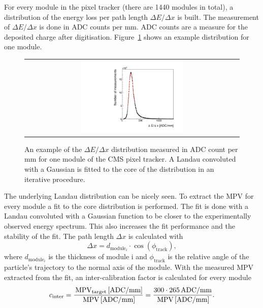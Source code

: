 For every module in the pixel tracker (there are 1440 modules in total), a distribution of the energy loss per path length $\Delta E/\Delta x$ is built.
The measurement of $\Delta E/\Delta x$ is done in ADC counts per mm.
ADC counts are a measure for the deposited charge after digitisation.
Figure~\ref{fig:dEdx_Module} shows an example distribution for one module.
\begin{figure}[!bt]
  \centering 
  \begin{tabular}{c}
  \includegraphics[width=0.49\textwidth]{figures/analysis/Landau_Module_352476680.pdf}
  \end{tabular}
  \caption{An example of the $\Delta E/\Delta x$ distribution measured in ADC count per mm for one module of the CMS pixel tracker. 
           A Landau convoluted with a Gaussian is fitted to the core of the distribution in an iterative procedure.} 
  \label{fig:dEdx_Module}
\end{figure}
The underlying Landau distribution can be nicely seen. 
To extract the MPV for every module a fit to the core distribution is performed.
The fit is done with a Landau convoluted with a Gaussian function to be closer to the experimentally observed energy spectrum.
This also increases the fit performance and the stability of the fit.
The path length $\Delta x$ is calculated with
\begin{equation*}
\Delta x = d_{\text{module}_i} \cdot \cos(\phi_{\text{track}}),
\end{equation*}
where $d_{\text{module}_i}$ is the thickness of module i and $\phi_{\text{track}}$ is the relative angle of the particle's trajectory to the normal axis of the module.
With the measured MPV extracted from the fit, an inter-calibration factor is calculated for every module
\begin{equation*}
c_{\text{inter}}=\frac{\,\text{MPV}_{\text{target}}\, [\text{ADC/mm}]}{\,\text{MPV}\, [\text{ADC/mm}]} = \frac{300 \cdot 265 \, \text{ADC/mm}}{\,\text{MPV}\, [\text{ADC/mm}]}.
\end{equation*}
